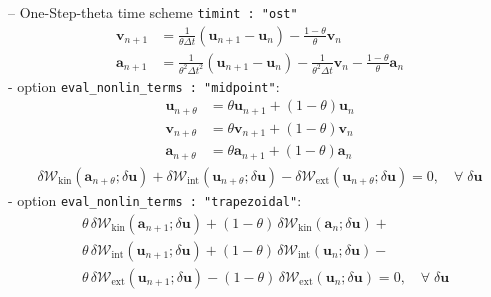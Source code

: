 \documentclass[a4paper,12pt]{report}
\begin{document}
-- One-Step-theta time scheme \verb.timint : "ost".
\begin{equation}
\begin{aligned}
\boldsymbol{v}_{n+1} &= \frac{1}{\theta\Delta t}(\boldsymbol{u}_{n+1}-\boldsymbol{u}_{n}) - \frac{1-\theta}{\theta} \boldsymbol{v}_{n} \\
\boldsymbol{a}_{n+1} &= \frac{1}{\theta^2\Delta t^2}(\boldsymbol{u}_{n+1}-\boldsymbol{u}_{n}) - \frac{1}{\theta^2\Delta t} \boldsymbol{v}_{n} - \frac{1-\theta}{\theta}\boldsymbol{a}_{n}
\end{aligned}
\end{equation}
\quad - option \verb.eval_nonlin_terms : "midpoint".:
\begin{equation}
\label{equation-solid-midpoint-ost}
\begin{aligned}
\boldsymbol{u}_{n+\theta} &= \theta \boldsymbol{u}_{n+1} + (1-\theta) \boldsymbol{u}_{n} \\
\boldsymbol{v}_{n+\theta} &= \theta \boldsymbol{v}_{n+1} + (1-\theta) \boldsymbol{v}_{n} \\
\boldsymbol{a}_{n+\theta} &= \theta \boldsymbol{a}_{n+1} + (1-\theta) \boldsymbol{a}_{n}
\end{aligned}
\end{equation}
\begin{equation}
\begin{aligned}
\delta \mathcal{W}_{\mathrm{kin}}(\boldsymbol{a}_{n+\theta};\delta\boldsymbol{u}) + \delta \mathcal{W}_{\mathrm{int}}(\boldsymbol{u}_{n+\theta};\delta\boldsymbol{u}) - \delta \mathcal{W}_{\mathrm{ext}}(\boldsymbol{u}_{n+\theta};\delta\boldsymbol{u}) = 0, \quad \forall \; \delta\boldsymbol{u}\end{aligned}
\end{equation}
\quad - option \verb.eval_nonlin_terms : "trapezoidal".:
\begin{equation}
\begin{aligned}
&\theta\,\delta \mathcal{W}_{\mathrm{kin}}(\boldsymbol{a}_{n+1};\delta\boldsymbol{u}) + (1-\theta)\,\delta \mathcal{W}_{\mathrm{kin}}(\boldsymbol{a}_{n};\delta\boldsymbol{u}) + \\
& \theta\,\delta \mathcal{W}_{\mathrm{int}}(\boldsymbol{u}_{n+1};\delta\boldsymbol{u}) + (1-\theta)\,\delta \mathcal{W}_{\mathrm{int}}(\boldsymbol{u}_{n};\delta\boldsymbol{u}) - \\
& \theta\,\delta \mathcal{W}_{\mathrm{ext}}(\boldsymbol{u}_{n+1};\delta\boldsymbol{u}) - (1-\theta)\,\delta \mathcal{W}_{\mathrm{ext}}(\boldsymbol{u}_{n};\delta\boldsymbol{u}) = 0, \quad \forall \; \delta\boldsymbol{u}
\end{aligned}
\end{equation}
\end{document}
